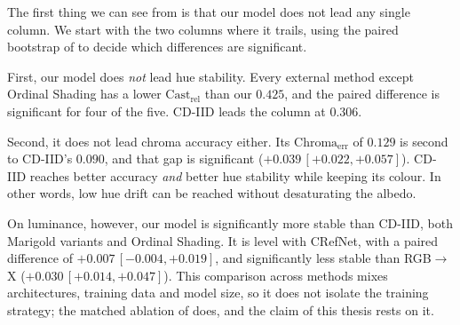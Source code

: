 The first thing we can see from  is that our model does not lead any single
column. We start with the two columns where it trails, using the paired bootstrap of
 to decide which differences are significant.

First, our model does \emph{not} lead hue stability. Every external method except Ordinal Shading
has a lower $\text{Cast}_{\text{rel}}$ than our $0.425$, and the paired difference is
significant for four of the five. CD-IID leads the column at $0.306$.

Second, it does not lead chroma accuracy either. Its $\text{Chroma}_{\text{err}}$ of $0.129$ is second
to CD-IID's $0.090$, and that gap is significant ($+0.039\,[+0.022, +0.057]$). CD-IID reaches
better accuracy \emph{and} better hue stability while keeping its colour. In other words,
low hue drift can be reached without desaturating the albedo.

On luminance, however, our model is significantly more stable than CD-IID, both Marigold
variants and Ordinal Shading. It is level with CRefNet, with a paired difference of
$+0.007\,[-0.004, +0.019]$, and significantly less stable than RGB$\rightarrow$X
($+0.030\,[+0.014, +0.047]$). This comparison across methods mixes
architectures, training data and model size, so it does not isolate the training strategy;
the matched ablation of  does, and the claim of this thesis rests on it.

